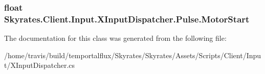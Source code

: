 \hypertarget{class_skyrates_1_1_client_1_1_input_1_1_x_input_dispatcher_1_1_pulse_a5f9b43b20bf6a10c7433e3f995504704}{
\subsubsection[{Motor\-Start}]{\setlength{\rightskip}{0pt plus 5cm}float Skyrates.\-Client.\-Input.\-X\-Input\-Dispatcher.\-Pulse.\-Motor\-Start}}\label{class_skyrates_1_1_client_1_1_input_1_1_x_input_dispatcher_1_1_pulse_a5f9b43b20bf6a10c7433e3f995504704}






The documentation for this class was generated from the following file\-:\begin{DoxyCompactItemize}
\item 
/home/travis/build/temportalflux/\-Skyrates/\-Skyrates/\-Assets/\-Scripts/\-Client/\-Input/X\-Input\-Dispatcher.\-cs\end{DoxyCompactItemize}
